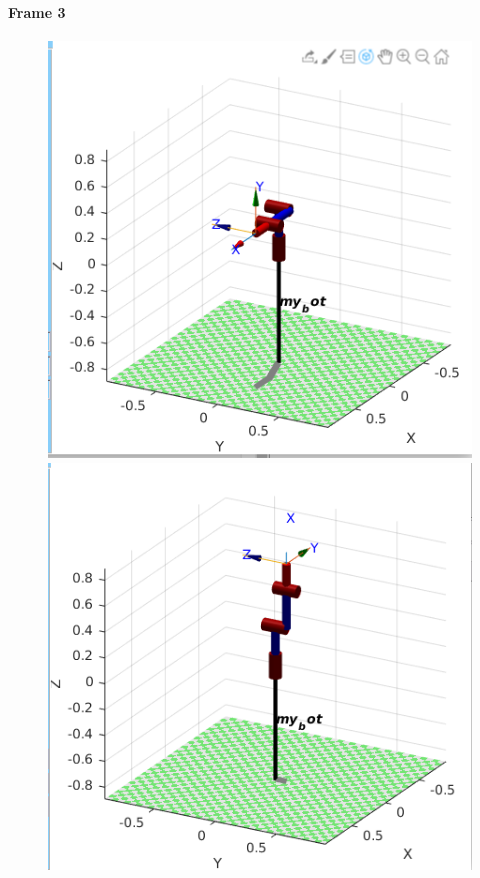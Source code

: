 \documentclass{article}
\begin{document}
\paragraph{Frame 3}
\begin{center}
\begin{figure}[!htb]
   \begin{minipage}{0.33\textwidth}
     \centering
     \includegraphics[width=\linewidth]{images/frame3.png}
   \end{minipage}\hfill
   \begin{minipage}{0.33\textwidth}
     \centering
     \includegraphics[width=\linewidth]{images/frame3_q2_90.png}

\end{minipage}
\end{figure}
\end{center}
\end{document}
